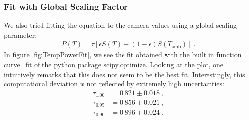 \subsubsection{Fit with Global Scaling Factor}
We also tried fitting the equation to the camera values using a global scaling parameter:
\begin{align}
	P(T) = \tau\left[\epsilon S(T) + (1-\epsilon)S(T_\text{amb})\right] \ .
\end{align}
In figure \ref{fig:TempPowerFit}, we see the fit obtained with the built in function \textsf{curve\_fit} of the \textsf{python} package \textsf{scipy.optimize}. Looking at the plot, one intuitively remarks that this does not seem to be the best fit. Interestingly, this computational deviation is not reflected by extremely high uncertainties:
\begin{align*}
	\tau_{1.00} &= 0.821\pm 0.018 \ , \\
	\tau_{0.95} &= 0.856\pm 0.021 \ , \\
	\tau_{0.90} &= 0.896\pm 0.024 \ . \\
\end{align*}
